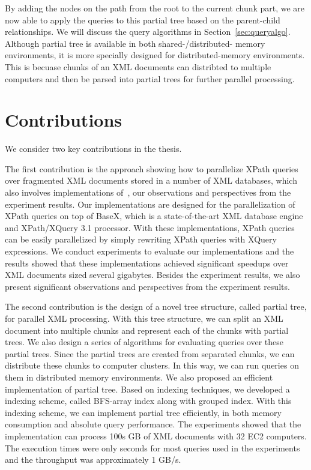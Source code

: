 By adding the nodes on the path from the root to the current chunk part, we are
now able to apply the queries to this partial tree based on the parent-child
relationships. We will discuss the query algorithms in
Section~\ref{sec:queryalgo}. Although partial tree is available in both
shared-/distributed- memory environments, it is more specially designed for
distributed-memory environments. This is becuase chunks of an XML documents can
distribted to multiple computers and then be parsed into partial trees for
further parallel processing.

\section{Contributions}

We consider two key contributions in the thesis.

The first contribution is the approach showing how to parallelize XPath queries
over fragmented XML documents stored in a number of XML databases, which also
involves implementations of~\cite{BoLS09}, our observations and perspectives
from the experiment results. Our implementations are designed for the
parallelization of XPath queries on top of BaseX, which is a state-of-the-art
XML database engine and XPath/XQuery 3.1 processor. With these implementations,
XPath queries can be easily parallelized by simply rewriting XPath queries with
XQuery expressions. We conduct experiments to evaluate our implementations and
the results showed that these implementations achieved significant speedups over
XML documents sized several gigabytes. Besides the experiment results, we also
present significant observations and perspectives from the experiment results.

The second contribution is the design of a novel tree structure, called partial
tree, for parallel XML processing. With this tree structure, we can split an XML
document into multiple chunks and represent each of the chunks with partial
trees. We also design a series of algorithms for evaluating queries over these
partial trees. Since the partial trees are created from separated chunks, we can
distribute these chunks to computer clusters. In this way, we can run queries on
them in distributed memory environments. We also proposed an efficient
implementation of partial tree. Based on indexing techniques, we developed a
indexing scheme, called BFS-array index along with grouped index. With this
indexing scheme, we can implement partial tree efficiently, in both memory
consumption and absolute query performance. The experiments showed that the
implementation can process 100s GB of XML documents with 32 EC2 computers. The
execution times were only seconds for most queries used in the experiments and
the throughput was approximately 1 GB/s.


